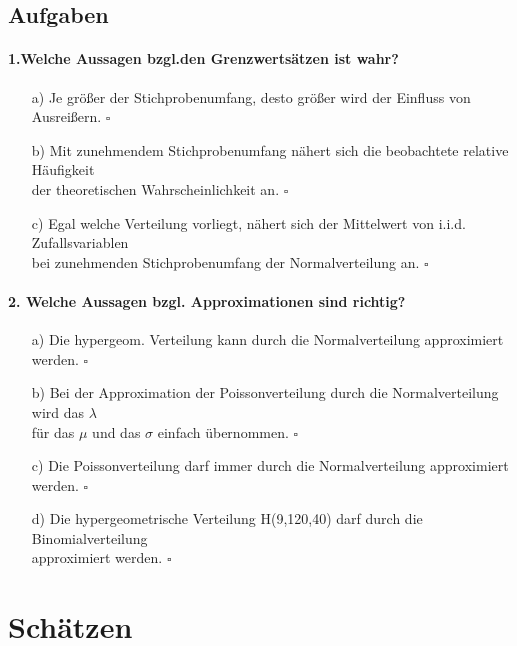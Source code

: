 \documentclass[a4paper]{article}
\begin{document}
\subsection{Aufgaben}
\paragraph{1.Welche Aussagen bzgl.den Grenzwertsätzen ist wahr?}
\begin{itemize}
    \item[a)] Je größer der Stichprobenumfang, desto größer wird der Einfluss von Ausreißern. \hfill $\square$
    \item[b)] Mit zunehmendem Stichprobenumfang nähert sich die beobachtete relative Häufigkeit\\ der theoretischen Wahrscheinlichkeit an. \hfill $\square$
    \item[c)] Egal welche Verteilung vorliegt, nähert sich der Mittelwert von i.i.d. Zufallsvariablen\\ bei zunehmenden Stichprobenumfang der Normalverteilung an. \hfill $\square$
\end{itemize}

\paragraph{2. Welche Aussagen bzgl. Approximationen sind richtig?}
\begin{itemize}
    \item[a)] Die hypergeom. Verteilung kann durch die Normalverteilung approximiert werden. \hfill $\square$
    \item[b)] Bei der Approximation der Poissonverteilung durch die Normalverteilung wird das $\lambda$\\ für das $\mu$ und das $\sigma$ einfach übernommen. \hfill $\square$
    \item[c)] Die Poissonverteilung darf immer durch die Normalverteilung approximiert werden. \hfill $\square$
    \item[d)] Die hypergeometrische Verteilung H(9,120,40) darf durch die Binomialverteilung \\approximiert werden. \hfill $\square$
\end{itemize}


\clearpage


\section{Schätzen}\label{chap:schaetzen}
\end{document}
